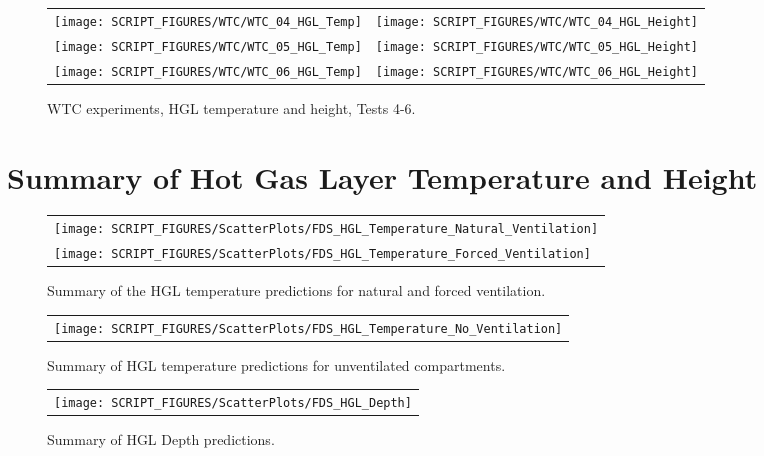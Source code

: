 \begin{figure}[p]
\begin{tabular*}{\textwidth}{l@{\extracolsep{\fill}}r}
\texttt{[image: SCRIPT\_FIGURES/WTC/WTC\_04\_HGL\_Temp]} &
\texttt{[image: SCRIPT\_FIGURES/WTC/WTC\_04\_HGL\_Height]} \\
\texttt{[image: SCRIPT\_FIGURES/WTC/WTC\_05\_HGL\_Temp]} &
\texttt{[image: SCRIPT\_FIGURES/WTC/WTC\_05\_HGL\_Height]} \\
\texttt{[image: SCRIPT\_FIGURES/WTC/WTC\_06\_HGL\_Temp]} &
\texttt{[image: SCRIPT\_FIGURES/WTC/WTC\_06\_HGL\_Height]}
\end{tabular*}
\caption[WTC experiments, HGL temperature and height, Tests 4-6]
{WTC experiments, HGL temperature and height, Tests 4-6.}
\label{WTC_HGL_2}
\end{figure}

\clearpage


\section{Summary of Hot Gas Layer Temperature and Height}
\label{HGL Temperature, Natural Ventilation}
\label{HGL Temperature, Forced Ventilation}
\label{HGL Temperature, No Ventilation}
\label{HGL Depth}


\begin{figure}[!h]
\centering
\begin{tabular}{l}
\texttt{[image: SCRIPT\_FIGURES/ScatterPlots/FDS\_HGL\_Temperature\_Natural\_Ventilation]} \\
\texttt{[image: SCRIPT\_FIGURES/ScatterPlots/FDS\_HGL\_Temperature\_Forced\_Ventilation]}
\end{tabular}
\caption[Summary of HGL temperature predictions for natural and forced ventilation]
{Summary of the HGL temperature predictions for natural and forced ventilation.}
\label{HGL_Summary_1}
\end{figure}

\newpage

\begin{figure}[!h]
\begin{center}
\begin{tabular}{l}
\texttt{[image: SCRIPT\_FIGURES/ScatterPlots/FDS\_HGL\_Temperature\_No\_Ventilation]}
\end{tabular}
\end{center}
\caption[Summary of HGL temperature for unventilated compartments]
{Summary of HGL temperature predictions for unventilated compartments.}
\label{HGL_Summary_2}
\end{figure}

\begin{figure}[!h]
\begin{center}
\begin{tabular}{l}
\texttt{[image: SCRIPT\_FIGURES/ScatterPlots/FDS\_HGL\_Depth]}
\end{tabular}
\end{center}
\caption[Summary of HGL Depth predictions]
{Summary of HGL Depth predictions.}
\label{HGL_Depth}
\end{figure}


